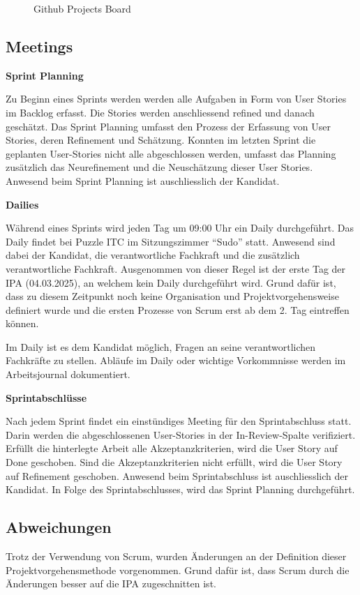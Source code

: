 \begin{figure}[h]
    \centering
    \caption{Github Projects Board}
\end{figure}

\subsection{Meetings}
\textbf{Sprint Planning}

Zu Beginn eines Sprints werden werden alle Aufgaben in Form von User Stories im Backlog erfasst.
Die Stories werden anschliessend refined und danach geschätzt. Das Sprint Planning umfasst den Prozess der Erfassung
von User Stories, deren Refinement und Schätzung. Konnten im letzten Sprint die geplanten User-Stories nicht alle abgeschlossen werden,
umfasst das Planning zusätzlich das Neurefinement und die Neuschätzung dieser User Stories. Anwesend beim Sprint Planning ist auschliesslich
der Kandidat.

\textbf{Dailies}

Während eines Sprints wird jeden Tag um 09:00 Uhr ein Daily durchgeführt. Das Daily findet bei Puzzle ITC
im Sitzungszimmer ``Sudo'' statt. Anwesend sind dabei der Kandidat, die verantwortliche Fachkraft und die zusätzlich verantwortliche
Fachkraft. Ausgenommen von dieser Regel ist der erste Tag der IPA (04.03.2025), an welchem kein Daily durchgeführt wird. Grund dafür ist, dass zu diesem Zeitpunkt noch keine
Organisation und Projektvorgehensweise definiert wurde und die ersten Prozesse von Scrum erst ab dem 2. Tag eintreffen können.

Im Daily ist es dem Kandidat möglich, Fragen an seine verantwortlichen Fachkräfte zu stellen. Abläufe im Daily oder wichtige 
Vorkommnisse werden im Arbeitsjournal dokumentiert.

\textbf{Sprintabschlüsse}
\label{sprintfinish}

Nach jedem Sprint findet ein einstündiges Meeting für den Sprintabschluss statt. Darin werden die abgeschlossenen User-Stories
in der In-Review-Spalte verifiziert. Erfüllt die hinterlegte Arbeit alle Akzeptanzkriterien, wird die User Story auf Done geschoben. 
Sind die Akzeptanzkriterien nicht erfüllt, wird die User Story auf Refinement geschoben. Anwesend beim Sprintabschluss ist auschliesslich der Kandidat.
In Folge des Sprintabschlusses, wird das Sprint Planning durchgeführt.

\subsection{Abweichungen}
Trotz der Verwendung von Scrum, wurden Änderungen an der Definition dieser Projektvorgehensmethode
vorgenommen. Grund dafür ist, dass Scrum durch die Änderungen besser auf die IPA zugeschnitten ist.

